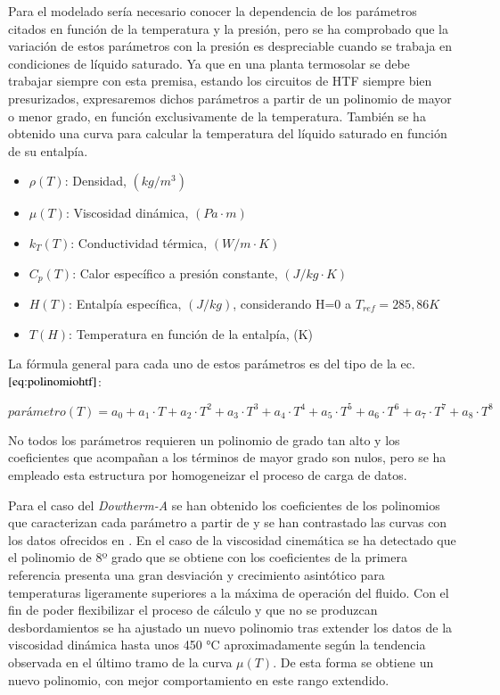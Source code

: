 Para el modelado sería necesario conocer la dependencia de los parámetros citados en función de la temperatura y la presión, pero se ha comprobado que la variación de estos parámetros con la presión es despreciable cuando se trabaja en condiciones de líquido saturado. Ya que en una planta termosolar se debe trabajar siempre con esta premisa, estando los circuitos de HTF siempre bien presurizados, expresaremos dichos parámetros  a partir de un polinomio de mayor o menor grado, en función exclusivamente de la temperatura. También se ha obtenido una curva para calcular la temperatura del líquido saturado en función de su entalpía.

\begin{itemize}
\item
  $\rho(T)$: Densidad, $(kg/m^3)$
\item
  $\mu(T)$: Viscosidad dinámica, $(Pa \cdot m)$
\item
  $k_T(T)$: Conductividad térmica, $(W/m \cdot K)$
\item
  $C_p(T)$: Calor específico a presión constante, $(J/kg\cdot K)$
\item
$H(T)$: Entalpía específica, $(J/kg)$, considerando H=0 a $T_{ref}= 285,86 K$
\item
$T(H)$: Temperatura en función de la entalpía, (K)
\end{itemize}

La fórmula general para cada uno de estos parámetros es del tipo de la ec.\(\eqref{eq:polinomiohtf}\):

\begin{equation}
   parámetro(T) = a_0 + a_1 \cdot T + a_2 \cdot T^2 + a_3 \cdot T^3 + a_4 \cdot T^4 + a_5 \cdot T^5 + a_6 \cdot T^6 +  a_7 \cdot T^7 + a_8 \cdot T^8   
    \label{eq:polinomiohtf}
\end{equation}

No todos los parámetros requieren un polinomio de grado tan alto y los coeficientes que acompañan a los términos de mayor grado son nulos, pero se ha empleado esta estructura por homogeneizar el proceso de carga de datos.

Para el caso del \emph{Dowtherm-A} se han obtenido los coeficientes de los polinomios que caracterizan cada parámetro a partir de \cite{richardl.mooreImplementationDOWTHERMProperties2010} y se han contrastado las curvas con los datos ofrecidos en \cite{machadoProductTechnicalData}. En el caso de la viscosidad cinemática se ha detectado que el polinomio de 8º grado que se obtiene con los coeficientes de la primera referencia presenta una gran desviación y crecimiento asintótico para temperaturas ligeramente superiores a la máxima de operación del fluido. Con el fin de poder flexibilizar el proceso de cálculo y que no se produzcan desbordamientos se ha ajustado un nuevo polinomio tras extender los datos de la viscosidad dinámica hasta unos 450 °C aproximadamente según la tendencia observada en el último tramo de la curva \(\mu(T)\). De esta forma se obtiene un nuevo polinomio, con mejor comportamiento en este rango extendido.

